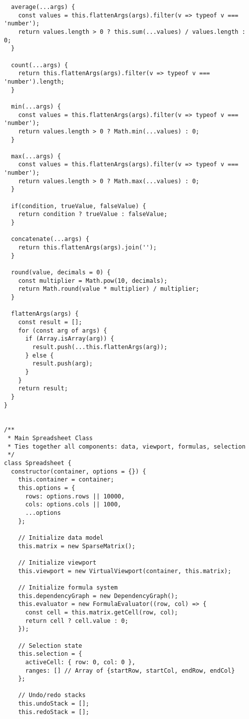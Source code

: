 \documentclass[11pt]{article}
\begin{document}
\begin{verbatim}
  average(...args) {
    const values = this.flattenArgs(args).filter(v => typeof v === 'number');
    return values.length > 0 ? this.sum(...values) / values.length : 0;
  }
  
  count(...args) {
    return this.flattenArgs(args).filter(v => typeof v === 'number').length;
  }
  
  min(...args) {
    const values = this.flattenArgs(args).filter(v => typeof v === 'number');
    return values.length > 0 ? Math.min(...values) : 0;
  }
  
  max(...args) {
    const values = this.flattenArgs(args).filter(v => typeof v === 'number');
    return values.length > 0 ? Math.max(...values) : 0;
  }
  
  if(condition, trueValue, falseValue) {
    return condition ? trueValue : falseValue;
  }
  
  concatenate(...args) {
    return this.flattenArgs(args).join('');
  }
  
  round(value, decimals = 0) {
    const multiplier = Math.pow(10, decimals);
    return Math.round(value * multiplier) / multiplier;
  }
  
  flattenArgs(args) {
    const result = [];
    for (const arg of args) {
      if (Array.isArray(arg)) {
        result.push(...this.flattenArgs(arg));
      } else {
        result.push(arg);
      }
    }
    return result;
  }
}


/**
 * Main Spreadsheet Class
 * Ties together all components: data, viewport, formulas, selection
 */
class Spreadsheet {
  constructor(container, options = {}) {
    this.container = container;
    this.options = {
      rows: options.rows || 10000,
      cols: options.cols || 1000,
      ...options
    };
    
    // Initialize data model
    this.matrix = new SparseMatrix();
    
    // Initialize viewport
    this.viewport = new VirtualViewport(container, this.matrix);
    
    // Initialize formula system
    this.dependencyGraph = new DependencyGraph();
    this.evaluator = new FormulaEvaluator((row, col) => {
      const cell = this.matrix.getCell(row, col);
      return cell ? cell.value : 0;
    });
    
    // Selection state
    this.selection = {
      activeCell: { row: 0, col: 0 },
      ranges: [] // Array of {startRow, startCol, endRow, endCol}
    };
    
    // Undo/redo stacks
    this.undoStack = [];
    this.redoStack = [];
    

\end{verbatim}
\end{document}
